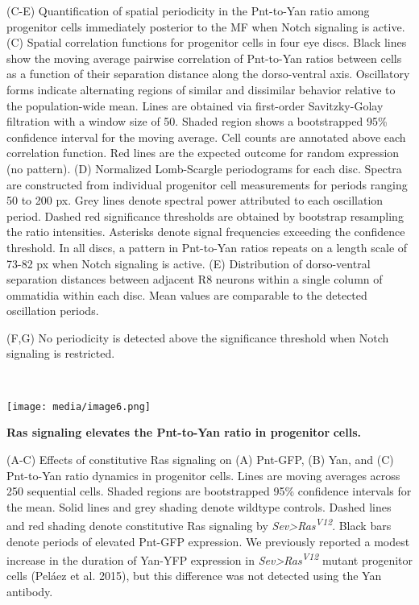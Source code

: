 (C-E) Quantification of spatial periodicity in the Pnt-to-Yan ratio among progenitor cells immediately posterior to the MF when Notch signaling is active. (C) Spatial correlation functions for progenitor cells in four eye discs. Black lines show the moving average pairwise correlation of Pnt-to-Yan ratios between cells as a function of their separation distance along the dorso-ventral axis. Oscillatory forms indicate alternating regions of similar and dissimilar behavior relative to the population-wide mean. Lines are obtained via first-order Savitzky-Golay filtration with a window size of 50. Shaded region shows a bootstrapped 95\% confidence interval for the moving average. Cell counts are annotated above each correlation function. Red lines are the expected outcome for random expression (no pattern). (D) Normalized Lomb-Scargle periodograms for each disc. Spectra are constructed from individual progenitor cell measurements for periods ranging 50 to 200 px. Grey lines denote spectral power attributed to each oscillation period. Dashed red significance thresholds are obtained by bootstrap resampling the ratio intensities. Asterisks denote signal frequencies exceeding the confidence threshold. In all discs, a pattern in Pnt-to-Yan ratios repeats on a length scale of 73-82 px when Notch signaling is active. (E) Distribution of dorso-ventral separation distances between adjacent R8 neurons within a single column of ommatidia within each disc. Mean values are comparable to the detected oscillation periods.

(F,G) No periodicity is detected above the significance threshold when Notch signaling is restricted.

\textbf{\\
}

\texttt{[image: media/image6.png]}

\textbf{Ras signaling elevates the Pnt-to-Yan ratio in progenitor} \textbf{cells.}

(A-C) Effects of constitutive Ras signaling on (A) Pnt-GFP, (B) Yan, and (C) Pnt-to-Yan ratio dynamics in progenitor cells. Lines are moving averages across 250 sequential cells. Shaded regions are bootstrapped 95\% confidence intervals for the mean. Solid lines and grey shading denote wildtype controls. Dashed lines and red shading denote constitutive Ras signaling by \emph{Sev\textgreater{}Ras\textsuperscript{V12}}. Black bars denote periods of elevated Pnt-GFP expression. We previously reported a modest increase in the duration of Yan-YFP expression in \emph{Sev\textgreater{}Ras\textsuperscript{V12}} mutant progenitor cells (Peláez et al. 2015), but this difference was not detected using the Yan antibody.

